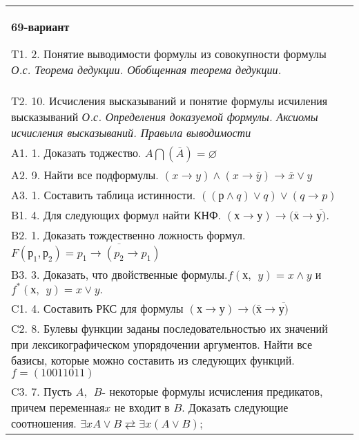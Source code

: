 \documentclass{article}
\begin{document}
\begin{tabular}{m{17cm}}
\textbf{69-вариант}
\newline

T1. 2. Понятие выводимости формулы из совокупности формулы \emph{О.с. Теорема дедукции. Обобщенная теорема дедукции.} \\
T2. 10. Исчисления высказываний и понятие формулы исчиления высказываний \emph{О.с. Определения доказуемой формулы. Аксиомы исчисления высказываний. Правыла выводимости} \\
A1. 1. Доказать тоджество. \(A\bigcap(\overline{A}) = \varnothing\) \\
A2. 9. Найти все подформулы. \((x \rightarrow y) \land (x \rightarrow \overline{y}) \rightarrow \overline{x} \vee y\) \\
A3. 1. Составить таблица истинности. \(\left( (р \land q) \vee q \right) \vee (q \rightarrow p)\) \\
B1. 4. Для следующих формул найти КНФ. \((х \rightarrow у) \rightarrow (\overline{х} \rightarrow \overline{у)}\). \\
B2. 1. Доказать тождественно ложность формул. \(F\left( р_{1},р_{2} \right) = \overline{p_{1} \rightarrow (p_{2} \rightarrow p_{1})}\) \\
B3. 3. Доказать, что двойственные формулы.\(f(х,\ \ y) = x \land y\) и \(f^{*}(х,\ \ y) = x \vee y.\) \\
C1. 4. Составить РКС для формулы \((х \rightarrow у) \rightarrow (\overline{х} \rightarrow \overline{у)}\) \\
C2. 8. Булевы функции заданы последовательностью их значений при лексикографическом упорядочении аргументов. Найти все базисы, которые можно составить из следующих функций. \(f = (10011011)\) \\
C3. 7. Пусть \(A,\ \ B\)- некоторые формулы исчисления предикатов, причем переменная\(x\) не входит в \(B\). Доказать следующие соотношения. \(\exists xA \vee B \rightleftarrows \exists x(A \vee B)\); \\

\end{tabular}
\vspace{1cm}
\end{document}

